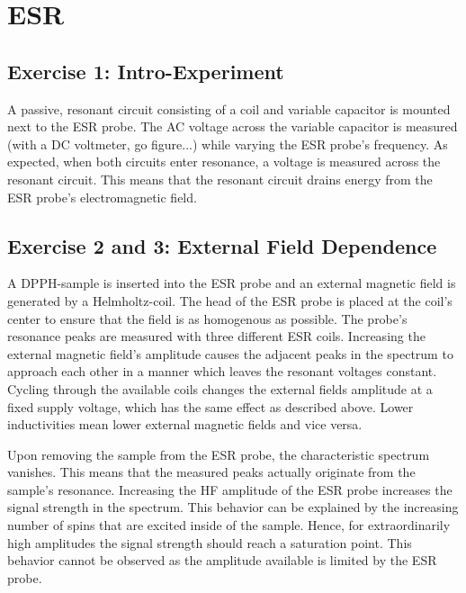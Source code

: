 \chapter{ESR}

\section{Exercise 1: Intro-Experiment}
A passive, resonant circuit consisting of a coil and variable capacitor is mounted next to the ESR probe.
The AC voltage across the variable capacitor is measured (with a DC voltmeter, go figure...) while varying the ESR probe's frequency.
As expected, when both circuits enter resonance, a voltage is measured across the resonant circuit.
This means that the resonant circuit drains energy from the ESR probe's electromagnetic field.%

\section{Exercise 2 and 3: External Field Dependence}
A DPPH-sample is inserted into the ESR probe and an external magnetic field is generated by a Helmholtz-coil.
The head of the ESR probe is placed at the coil's center to ensure that the field is as homogenous as possible.
The probe's resonance peaks are measured with three different ESR coils.
Increasing the external magnetic field's amplitude causes the adjacent peaks in the spectrum to approach each other in a manner which leaves the resonant voltages constant.	
Cycling through the available coils changes the external fields amplitude at a fixed supply voltage, which has the same effect as described above. 
Lower inductivities mean lower external magnetic fields and vice versa.	

Upon removing the sample from the ESR probe, the characteristic spectrum vanishes.
This means that the measured peaks actually originate from the sample's resonance.
Increasing the HF amplitude of the ESR probe increases the signal strength in the spectrum.
This behavior can be explained by the increasing number of spins that are excited inside of the sample.
Hence, for extraordinarily high amplitudes the signal strength should reach a saturation point.
This behavior cannot be observed as the amplitude available is limited by the ESR probe.

